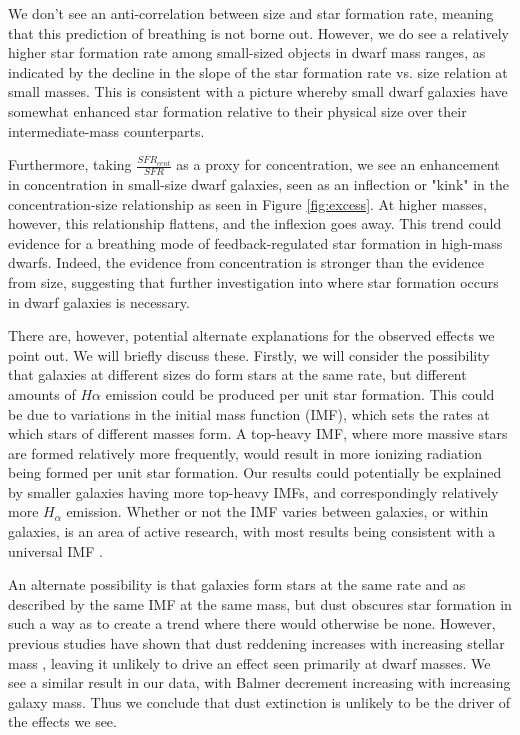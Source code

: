 \documentclass[iop]{emulateapj}
\begin{document}
We don't see an anti-correlation between size and star formation rate, meaning that this prediction of breathing is not borne out. However, we do see a relatively higher star formation rate among small-sized objects in dwarf mass ranges, as indicated by the decline in the slope of the star formation rate vs. size relation at small masses. This is consistent with a picture whereby small dwarf galaxies have somewhat enhanced star formation relative to their physical size over their intermediate-mass counterparts.

 Furthermore, taking $\frac{SFR_{cent}}{SFR}$ as a proxy for concentration, we see an enhancement in concentration in small-size dwarf galaxies, seen as an inflection or "kink" in the concentration-size relationship as seen in Figure \ref{fig:excess}. At higher masses, however, this relationship flattens, and the inflexion goes away. This trend could evidence for a breathing mode of feedback-regulated star formation in high-mass dwarfs. Indeed, the evidence from concentration is stronger than the evidence from size, suggesting that further investigation into where star formation occurs in dwarf galaxies is necessary.

There are, however, potential alternate explanations for the observed effects we point out. We will briefly discuss these. Firstly, we will consider the possibility that galaxies at different sizes do form stars at the same rate, but different amounts of $H\alpha$ emission could be produced per unit star formation. This could be due to variations in the initial mass function (IMF), which sets the rates at which stars of different masses form. A top-heavy IMF, where more massive stars are formed relatively more frequently, would result in more ionizing radiation being formed per unit star formation. Our results could potentially be explained by smaller galaxies having more top-heavy IMFs, and correspondingly relatively more $H_{\alpha}$ emission. Whether or not the IMF varies between galaxies, or within galaxies, is an area of active research, with most results being consistent with a universal IMF \citep[e.g.,][]{Lee09,Bastian10}. 

An alternate possibility is that galaxies form stars at the same rate and as described by the same IMF at the same mass, but dust obscures star formation in such a way as to create a trend where there would otherwise be none. However, previous studies have shown that dust reddening increases with increasing stellar mass \citep{Garn10}, leaving it unlikely to drive an effect seen primarily at dwarf masses. We see a similar result in our data, with Balmer decrement increasing with increasing galaxy mass. Thus we conclude that dust extinction is unlikely to be the driver of the effects we see.
\end{document}

